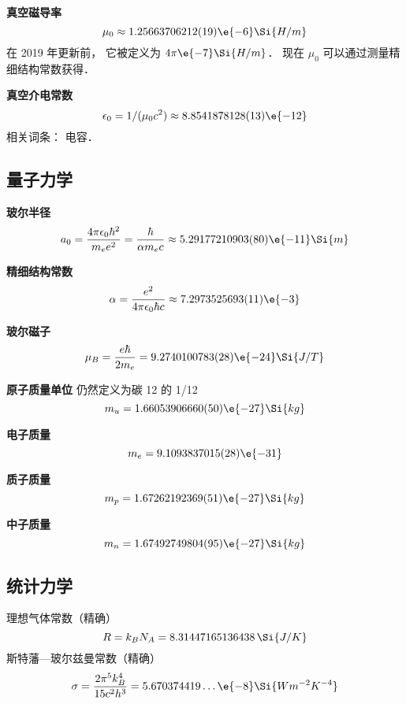 \textbf{真空磁导率}
\begin{equation}
\mu_0 \approx 1.25663706212(19)\e{-6} \Si{H/m}
\end{equation}
在 2019 年更新前， 它被定义为 $4\pi\e{-7} \Si{H/m}$． 现在 $\mu_0$ 可以通过测量精细结构常数获得．

\textbf{真空介电常数}
\begin{equation}
\epsilon_0 = 1/(\mu_0 c^2) \approx 8.8541878128(13)\e{-12}
\end{equation}
相关词条： 电容．

\subsection{量子力学}
\textbf{玻尔半径}
\begin{equation}
a_0 = \frac{4\pi \epsilon_0 \hbar^2}{m_e e^2} = \frac{\hbar}{\alpha m_e c} \approx 5.29177210903(80)\e{-11}\Si{m}
\end{equation}

\textbf{精细结构常数}
\begin{equation}
\alpha = \frac{e^2}{4\pi\epsilon_0\hbar c} \approx 7.2973525693(11)\e{-3}
\end{equation}

\textbf{玻尔磁子}
\begin{equation}
\mu_B = \frac{e\hbar}{2m_e} = 9.2740100783(28)\e{-24} \Si{J/T}
\end{equation}

\textbf{原子质量单位}
仍然定义为碳 12 的 1/12
\begin{equation}
m_u = 1.66053906660(50)\e{-27} \Si{kg}
\end{equation}

\textbf{电子质量}
\begin{equation}
m_e = 9.1093837015(28)\e{-31}
\end{equation}

\textbf{质子质量}
\begin{equation}
m_p = 1.67262192369(51)\e{-27}\Si{kg}
\end{equation}

\textbf{中子质量}
\begin{equation}
m_n = 1.67492749804(95)\e{-27}\Si{kg}
\end{equation}

\subsection{统计力学}
理想气体常数（精确）
\begin{equation}
R = k_B N_A = 8.31447165136438 \,\Si{J/K}
\end{equation}
斯特藩—玻尔兹曼常数（精确）
\begin{equation}
\sigma = \frac{2\pi^5k_B^4}{15c^2h^3} = 5.670374419\dots\e{-8} \Si{Wm^{-2}K^{-4}}
\end{equation}
